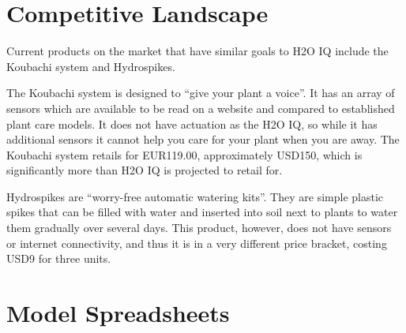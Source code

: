 \documentclass[11pt]{article}
\begin{document}
\section{Competitive Landscape}

Current products on the market that have similar goals to H2O IQ include the Koubachi system and Hydrospikes.

The Koubachi system is designed to ``give your plant a voice''.  It has an array of sensors which are available to be read on a website and compared to established plant care models.  It does not have actuation as the H2O IQ, so while it has additional sensors it cannot help you care for your plant when you are away.  The Koubachi system retails for EUR119.00, approximately USD150, which is significantly more than H2O IQ is projected to retail for.

Hydrospikes are ``worry-free automatic watering kits''.  They are simple plastic spikes that can be filled with water and inserted into soil next to plants to water them gradually over several days.  This product, however, does not have sensors or internet connectivity, and thus it is in a very different price bracket, costing USD9 for three units.
\section{Model Spreadsheets}

\end{document}
